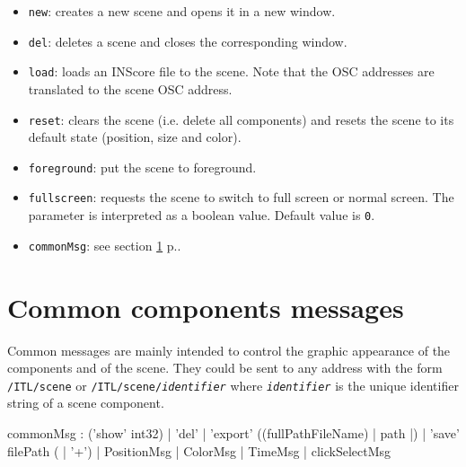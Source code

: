 \documentclass[a4paper,twoside]{report}
\newcommand{\toplevel}[1]	{\chapter{#1}}
\newcommand{\fullref}[1]	{\ref{#1} p.\pageref{#1}}
\newcommand{\OSC}[1]		{\texttt{#1}}
\newcommand{\values}[1]	{\texttt{#1}}
\begin{document}
\begin{itemize}
\item \OSC{new}: creates a new scene and opens it in a new window.
\item \OSC{del}: deletes a scene and closes the corresponding window.
\item \OSC{load}: loads an INScore file to the scene. Note that the OSC addresses are translated to the scene OSC address.
\item \OSC{reset}: clears the scene (i.e. delete all components) and resets the scene to its default state (position, size and color).
\item \OSC{foreground}: put the scene to foreground.
\item \OSC{fullscreen}: requests the scene to switch to full screen or normal screen.  The parameter is interpreted as a boolean value. Default value is \values{0}.
\item \OSC{commonMsg}: see section \fullref{common}.
\end{itemize}


\toplevel{Common components messages}
\label{common}
Common messages are mainly intended to control the graphic appearance of the components and  of the scene.
They could be sent to any address with the form \OSC{/ITL/scene} or \OSC{/ITL/scene/\textit{identifier}} where \OSC{\textit{identifier}} is the unique identifier string of a scene component.
\begin{rail}
commonMsg :  ('show' int32)
			| 'del'
			| 'export' ((fullPathFileName) | path |)
			| 'save' filePath ( | '+')
			| PositionMsg
			| ColorMsg
			| TimeMsg
			| clickSelectMsg
\end{rail}
\end{document}
